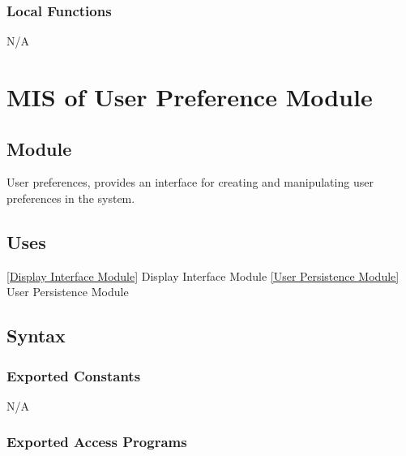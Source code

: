 \documentclass[12pt, titlepage]{article}
\begin{document}
%

\subsubsection{Local Functions}
N/A

\newpage
\section{MIS of {User Preference Module}} \label{User Preference Module}
%
%

\subsection{Module}
User preferences, provides an interface for creating and manipulating user preferences in the system.

\subsection{Uses}
\ref{Display Interface Module} {Display Interface Module}
\ref{User Persistence Module} {User Persistence Module}
\subsection{Syntax}

\subsubsection{Exported Constants}
N/A
\subsubsection{Exported Access Programs}
\end{document}
